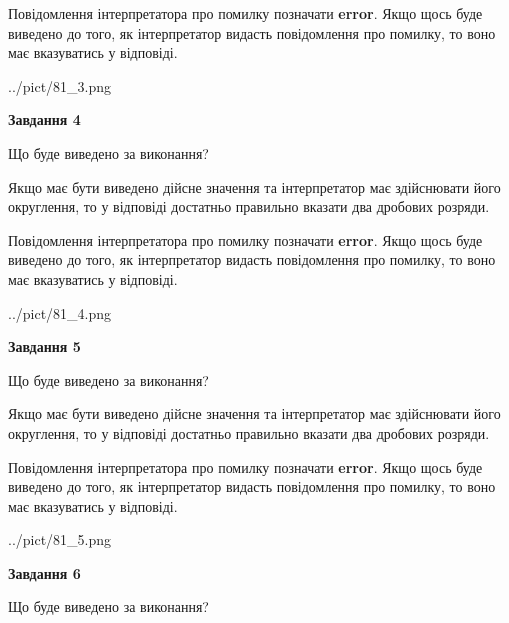 \documentclass[12pt, ukrainian]{article}
\begin{document}
{\begin {Large}
Повідомлення інтерпретатора про помилку позначати \textbf{error}.
Якщо щось буде виведено до того, як інтерпретатор видасть повідомлення про помилку, 
то воно має вказуватись у відповіді. \par

\begin{center}
	{../pict/81_3.png}
\end{center}
\newpage

{\begin {center}\textbf{Завдання 4}\end {center}}\par
Що буде виведено за виконання? \par

Якщо має бути виведено дійсне значення та інтерпретатор має здійснювати його округлення, 
то у відповіді достатньо правильно вказати два дробових розряди.

Повідомлення інтерпретатора про помилку позначати \textbf{error}.
Якщо щось буде виведено до того, як інтерпретатор видасть повідомлення про помилку, 
то воно має вказуватись у відповіді. \par

\begin{center}
	{../pict/81_4.png}
\end{center}
\newpage

{\begin {center}\textbf{Завдання 5}\end {center}}\par
Що буде виведено за виконання? \par

Якщо має бути виведено дійсне значення та інтерпретатор має здійснювати його округлення, 
то у відповіді достатньо правильно вказати два дробових розряди.

Повідомлення інтерпретатора про помилку позначати \textbf{error}.
Якщо щось буде виведено до того, як інтерпретатор видасть повідомлення про помилку, 
то воно має вказуватись у відповіді. \par

\begin{center}
	{../pict/81_5.png}
\end{center}
\newpage

{\begin {center}\textbf{Завдання 6}\end {center}}\par
Що буде виведено за виконання? \par


\end{Large}}
\end{document}
